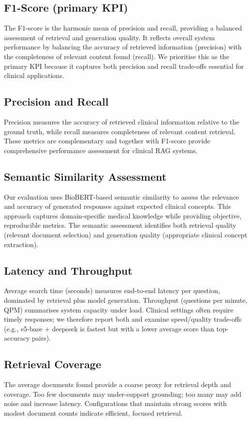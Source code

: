 \subsection{F1-Score (primary KPI)}
The F1-score is the harmonic mean of precision and recall, providing a balanced assessment of retrieval and generation quality. It reflects overall system performance by balancing the accuracy of retrieved information (precision) with the completeness of relevant content found (recall). We prioritise this as the primary KPI because it captures both precision and recall trade-offs essential for clinical applications.

\subsection{Precision and Recall}
Precision measures the accuracy of retrieved clinical information relative to the ground truth, while recall measures completeness of relevant content retrieval. These metrics are complementary and together with F1-score provide comprehensive performance assessment for clinical RAG systems.

\subsection{Semantic Similarity Assessment}
Our evaluation uses BioBERT-based semantic similarity to assess the relevance and accuracy of generated responses against expected clinical concepts. This approach captures domain-specific medical knowledge while providing objective, reproducible metrics. The semantic assessment identifies both retrieval quality (relevant document selection) and generation quality (appropriate clinical concept extraction).

\subsection{Latency and Throughput}
Average search time (seconds) measures end-to-end latency per question, dominated by retrieval plus model generation. Throughput (questions per minute, QPM) summarises system capacity under load. Clinical settings often require timely responses; we therefore report both and examine speed/quality trade-offs (e.g., e5-base + deepseek is fastest but with a lower average score than top-accuracy pairs).

\subsection{Retrieval Coverage}
The average documents found provide a coarse proxy for retrieval depth and coverage. Too few documents may under-support grounding; too many may add noise and increase latency. Configurations that maintain strong scores with modest document counts indicate efficient, focused retrieval.

